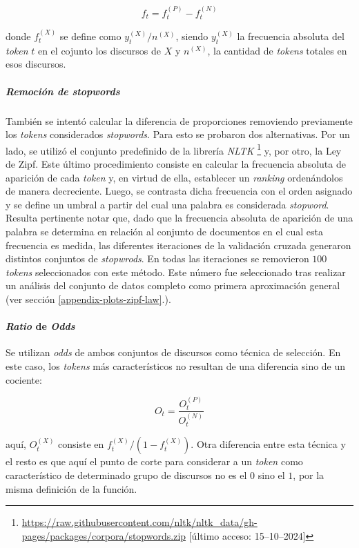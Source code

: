 \begin{equation}
    f_t = f_{t}^{(P)}-f_{t}^{(N)}
\end{equation}


donde $f_{t}^{(X)}$ se define como $y_{t}^{(X)} / n^{(X)}$, siendo $y_{t}^{(X)}$
la frecuencia absoluta del \textit{token} $t$ en el cojunto los discursos de $X$
y $n^{(X)}$, la cantidad de \textit{tokens} totales en esos discursos.

\subparagraph{Remoci\'on de \textit{stopwords}}
\label{paragraph-methods-proportions-stopwords}
Tambi\'en se intent\'o calcular la diferencia de proporciones removiendo
previamente los \textit{tokens} considerados \textit{stopwords}.
Para esto se probaron dos alternativas.
Por un lado, se utiliz\'o el conjunto predefinido de la librer\'ia \textit{NLTK}
\footnote{\url{https://raw.githubusercontent.com/nltk/nltk_data/gh-pages/packages/corpora/stopwords.zip} [\'ultimo acceso: 15--10--2024]}
y, por otro, la Ley de Zipf.
Este \'ultimo procedimiento consiste en calcular la frecuencia absoluta de aparici\'on de
cada \textit{token} y, en virtud de ella, establecer un \textit{ranking}
orden\'andolos de manera decreciente.
Luego, se contrasta dicha frecuencia con el orden asignado y se define
un umbral a partir del cual una palabra es considerada \textit{stopword}.
Resulta pertinente notar que, dado que la frecuencia absoluta de aparici\'on
de una palabra se determina en relaci\'on al conjunto de documentos en el cual
esta frecuencia es medida, las diferentes iteraciones de la validaci\'on cruzada
generaron distintos conjuntos de \textit{stopwrods}.
En todas las iteraciones se removieron $100$ \textit{tokens} seleccionados
con este m\'etodo. Este n\'umero fue seleccionado tras realizar un an\'alisis del
conjunto de datos completo como primera aproximaci\'on general (ver secci\'on
\ref{appendix-plots-zipf-law}.).

\paragraph{\textit{Ratio} de \textit{Odds}}
Se utilizan \textit{odds} de ambos conjuntos de discursos como
t\'ecnica de selecci\'on. En este caso, los \textit{tokens} m\'as caracter\'isticos
no resultan de una diferencia sino de un cociente:

\begin{equation}
    O_{t} = \frac{O_{t}^{(P)}}{O_{t}^{(N)}}
\end{equation}

aqu\'i, $O_{t}^{(X)}$ consiste en $f_{t}^{(X)}/(1-f_{t}^{(X)})$.
Otra diferencia entre esta t\'ecnica y el resto es que aqu\'i el punto de
corte para considerar a un \textit{token} como caracter\'istico de
determinado grupo de discursos no es el $0$ sino el $1$, por la misma
definici\'on de la funci\'on.


